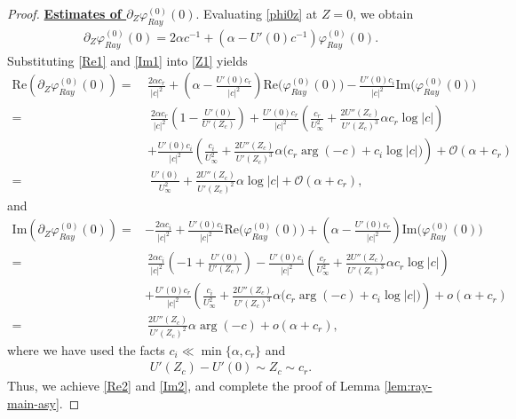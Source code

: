 \documentclass[reqno,11pt]{amsart}
\numberwithin{equation}{section}
\numberwithin{equation}{section}
\theoremstyle{plain}
\begin{document}
\begin{proof}
		
		\underline{\bf{ Estimates of $\partial_Z\varphi_{Ray}^{(0)}(0)$}}. Evaluating \eqref{phi0z} at $Z=0$, we obtain
		\begin{align}%
				\partial_Z\varphi_{Ray}^{(0)}(0)
				= 2\alpha c^{-1}+\left(\alpha-U'(0) c^{-1}\right)\varphi_{Ray}^{(0)}(0).\label{Z1}
			\end{align}
			Substituting \eqref{Re1} and \eqref{Im1} into \eqref{Z1} yields
			\begin{align*}%
					\text{Re}(\partial_Z\varphi_{Ray}^{(0)}(0)) =~& \frac{2\alpha c_r}{|c|^2}
					+\left(\alpha-\frac{U'(0)c_r}{|c|^2}\right)\text{Re}\big(\varphi_{Ray}^{(0)}(0)\big)
					-\frac{U'(0)c_i}{|c|^2}\text{Im}\big(\varphi_{Ray}^{(0)}(0)\big)\\
					=&~\frac{2\alpha c_r}{|c|^2}\left(1-\frac{ U'(0)}{U'(Z_c)}\right)
					+%
					\frac{U'(0)c_r}{|c|^2}\left(\frac{c_r}{U_\infty^2}
					+\frac{2U''(Z_c)}{U'(Z_c)^3}\alpha c_r\log|c|\right)\\
					&+\frac{U'(0)c_i}{|c|^2}\left(\frac{c_i}{U_\infty^2}
					+\frac{2U''(Z_c)}{U'(Z_c)^3}\alpha \big(c_r\arg(-c)+c_i\log|c|\big)\right)+\mathcal{O}(\alpha+c_r)\\
					=&~\frac{U'(0)}{U_\infty^2}+\frac{2U''(Z_c)}{U'(Z_c)^2}\alpha\log|c|
					+\mathcal{O}(\alpha+c_r),
				\end{align*}
				and
				\begin{align*}%
						\text{Im}(\partial_Z\varphi_{Ray}^{(0)}(0)) =& -\frac{2\alpha c_i}{|c|^2}
						+\frac{U'(0)c_i}{|c|^2}\text{Re}\big(\varphi_{Ray}^{(0)}(0)\big)
						+\left(\alpha-\frac{U'(0)c_r}{|c|^2}\right)\text{Im}\big(\varphi_{Ray}^{(0)}(0)\big)\\
						=&~\frac{2\alpha c_i}{|c|^2}\left(-1+\frac{ U'(0)}{U'(Z_c)}\right)
						-\frac{U'(0)c_i}{|c|^2}\left(\frac{c_r}{U_\infty^2}
						+\frac{2U''(Z_c)}{U'(Z_c)^3}\alpha c_r\log|c|\right)\\
						&+%
						\frac{U'(0)c_r}{|c|^2}\left(\frac{c_i}{U_\infty^2}
						+\frac{2U''(Z_c)}{U'(Z_c)^3}\alpha \big(c_r\arg(-c)+c_i\log|c|\big)\right)+o(\alpha+c_r)\\
						=&~\frac{2U''(Z_c)}{U'(Z_c)^2}\alpha\arg(-c)
						+o(\alpha+c_r),
					\end{align*}
					where we have used the facts $c_i\ll\min\{\alpha, c_r\}$ and 
					\begin{align}
						U'(Z_c)-U'(0)\sim Z_c\sim c_r.\nonumber
					\end{align}
					 Thus, we achieve \eqref{Re2} and \eqref{Im2}, and  complete the proof of Lemma \ref{lem:ray-main-asy}.
					
				\end{proof}
				
\end{document}
